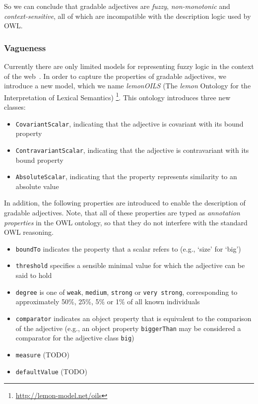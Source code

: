 \documentclass[11pt]{article}
\begin{document}
So we can conclude that gradable adjectives are \emph{fuzzy}, \emph{non-monotonic} 
and \emph{context-sensitive}, all of which are incompatible with the description 
logic used by OWL.

\subsubsection{Vagueness}

Currently there are only limited models for representing fuzzy 
logic in the context of the web~\cite{zhao2008uncertainty}. In order to capture the 
properties of gradable adjectives, we introduce a new model, which we name 
\emph{lemonOILS} (The \emph{lemon} Ontology for the Interpretation of Lexical Semantics)
\footnote{\url{http://lemon-model.net/oils}}. This ontology introduces three 
new classes:

\begin{itemize}
	\item {\tt CovariantScalar}, indicating that the adjective is covariant with its bound property
	\item {\tt ContravariantScalar}, indicating that the adjective is contravariant with its bound property
	\item {\tt AbsoluteScalar}, indicating that the property represents similarity to an absolute value
\end{itemize}

In addition, the following properties are introduced to enable the description 
of gradable adjectives. Note, that all of these properties are typed as 
\emph{annotation properties} in the OWL ontology, so that they do not interfere 
with the standard OWL reasoning.

\begin{itemize}
	\item {\tt boundTo} indicates the property that a scalar refers to (e.g., `size' for `big')
	\item {\tt threshold} specifies a sensible minimal value for which the adjective can be said to hold
	\item {\tt degree} is one of {\tt weak}, {\tt medium}, {\tt strong} or {\tt very strong}, corresponding to approximately 50\%, 25\%, 5\% or 1\% of all known individuals
	\item {\tt comparator} indicates an object property that is equivalent to the comparison of the adjective (e.g., an object property {\tt biggerThan} may be considered a comparator for the adjective class {\tt big})
	\item {\tt measure} (TODO)
	\item {\tt defaultValue} (TODO)
\end{itemize}
\end{document}
